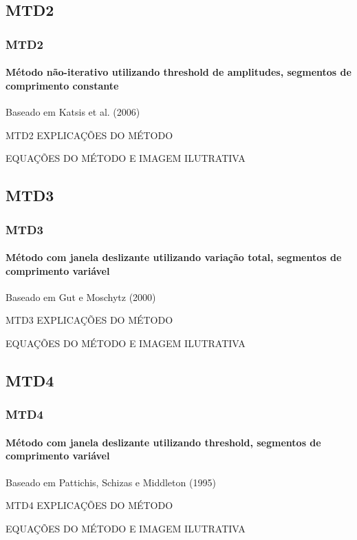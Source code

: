 \documentclass{beamer}
\begin{document}
	
	\subsection[MTD2]{MTD2}
	\begin{frame}
		\frametitle{MTD2}
		\framesubtitle{Método não-iterativo utilizando threshold de amplitudes, segmentos de comprimento constante}
		
		Baseado em Katsis et al. (2006)
		
		\begin{block}{MTD2}
			EXPLICAÇÕES DO MÉTODO
		\end{block}
		
		EQUAÇÕES DO MÉTODO E IMAGEM ILUTRATIVA
		
	\end{frame}
	
	\subsection[MTD3]{MTD3}
	\begin{frame}
		\frametitle{MTD3}
		\framesubtitle{Método com janela deslizante utilizando variação total, segmentos de comprimento variável}
		
		Baseado em Gut e Moschytz (2000)
		
		\begin{block}{MTD3}
			EXPLICAÇÕES DO MÉTODO
		\end{block}
		
		EQUAÇÕES DO MÉTODO E IMAGEM ILUTRATIVA
		
	\end{frame}
	
	\subsection[MTD4]{MTD4}
	\begin{frame}
		\frametitle{MTD4}
		\framesubtitle{Método com janela deslizante utilizando threshold, segmentos de comprimento variável}
		
		Baseado em Pattichis, Schizas e Middleton (1995)
		
		\begin{block}{MTD4}
			EXPLICAÇÕES DO MÉTODO
		\end{block}
		
		EQUAÇÕES DO MÉTODO E IMAGEM ILUTRATIVA
		
	\end{frame}
\end{document}
